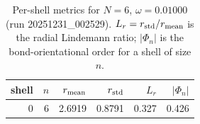\begin{table}[t]
\centering
\small
\setlength{\tabcolsep}{4pt}
\renewcommand{\arraystretch}{1.15}
\begin{tabular}{r r r r r r}
\toprule
shell & $n$ & $r_{\rm mean}$ & $r_{\rm std}$ & $L_r$ & $|\Phi_n|$ \\
\midrule
0 & 6 & 2.6919 & 0.8791 & 0.327 & 0.426 \\
\bottomrule
\end{tabular}
\caption{Per-shell metrics for $N=6$, $\omega=0.01000$ (run 20251231_002529). $L_r=r_{\rm std}/r_{\rm mean}$ is the radial Lindemann ratio; $|\Phi_n|$ is the bond-orientational order for a shell of size $n$.}
\end{table}